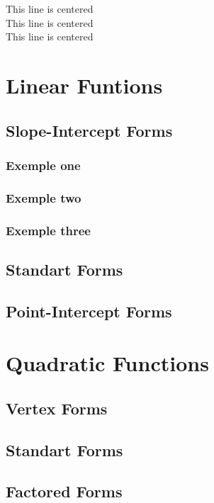 \documentclass[12pt]{article}
\begin{document}
This line is centered\\
This line is centered\\
This line is centered

\section{Linear Funtions}
        \subsection{Slope-Intercept Forms}
                \subsubsection{Exemple one}
                \subsubsection{Exemple two}
                \subsubsection{Exemple three}
        \subsection{Standart Forms}
        \subsection{Point-Intercept Forms}
\section{Quadratic Functions}
        \subsection{Vertex Forms}
        \subsection{Standart Forms}
        \subsection{Factored Forms}
\end{document}
